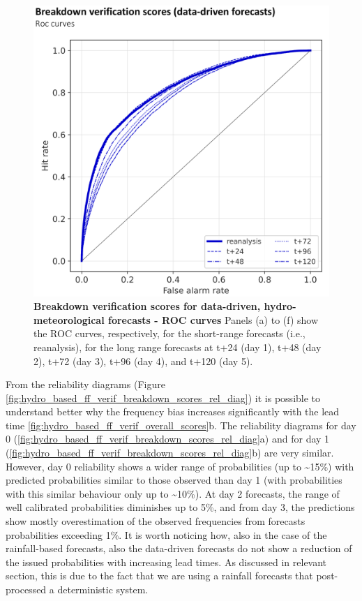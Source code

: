 \begin{figure}[htbp]
\centering
\includegraphics[width=\textwidth]{hydro_based_ff_verif_breakdown_scores_roc.png}
\caption{\textbf{Breakdown verification scores for data-driven, hydro-meteorological forecasts - ROC curves} Panels (a) to (f) show the ROC curves, respectively, for the short-range forecasts (i.e., reanalysis), for the long range forecasts at t+24 (day 1), t+48 (day 2), t+72 (day 3), t+96 (day 4), and t+120 (day 5).}
\label{fig:hydro_based_ff_verif_breakdown_scores_roc}
\end{figure}

From the reliability diagrams (Figure \ref{fig:hydro_based_ff_verif_breakdown_scores_rel_diag}) it is possible to understand better why the frequency bias increases significantly with the lead time \ref{fig:hydro_based_ff_verif_overall_scores}b. The reliability diagrams for day 0 (\ref{fig:hydro_based_ff_verif_breakdown_scores_rel_diag}a) and for day 1 (\ref{fig:hydro_based_ff_verif_breakdown_scores_rel_diag}b) are very similar. However, day 0 reliability shows a wider range of probabilities (up to \sim 15\%) with predicted probabilities similar to those observed than day 1 (with probabilities with this similar behaviour only up to \sim 10\%). At day 2 forecasts, the range of well calibrated probabilities diminishes up to 5\%, and from day 3, the predictions show mostly overestimation of the observed frequencies from forecasts probabilities exceeding 1\%. It is worth noticing how, also in the case of the rainfall-based forecasts, also the data-driven forecasts do not show a reduction of the issued probabilities with increasing lead times. As discussed in relevant section, this is due to the fact that we are using a rainfall forecasts that post-processed a deterministic system.


